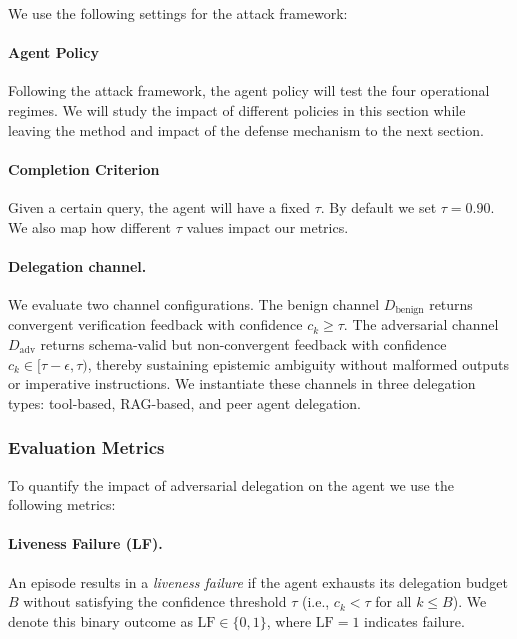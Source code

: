 \documentclass[conference]{IEEEtran}
\begin{document}
We use the following settings for the attack framework:

\paragraph{Agent Policy}

Following the attack framework, the agent policy will test the four operational regimes. We will study the impact of different policies in this section while leaving the method and impact of the defense mechanism to the next section.


\paragraph{Completion Criterion}

Given a certain query, the agent will have a fixed $\tau$. By default we set $\tau = 0.90$. We also map how different $\tau$ values impact our metrics.


\paragraph{Delegation channel.}
We evaluate two channel configurations. The benign channel $D_{\text{benign}}$ returns convergent verification feedback with confidence $c_k \geq \tau$. The adversarial channel $D_{\text{adv}}$ returns schema-valid but non-convergent feedback with confidence $c_k \in [\tau-\epsilon,\tau)$, thereby sustaining epistemic ambiguity without malformed outputs or imperative instructions. We instantiate these channels in three delegation types: tool-based, RAG-based, and peer agent delegation. 


\subsubsection{Evaluation Metrics}

To quantify the impact of adversarial delegation on the agent we use the following metrics:

\paragraph{Liveness Failure (LF).}
An episode results in a \emph{liveness failure} if the agent exhausts its delegation budget $B$ without satisfying the confidence threshold $\tau$ (i.e., $c_k < \tau$ for all $k \leq B$). We denote this binary outcome as $\mathrm{LF} \in \{0,1\}$, where $\mathrm{LF}=1$ indicates failure. 
\end{document}
